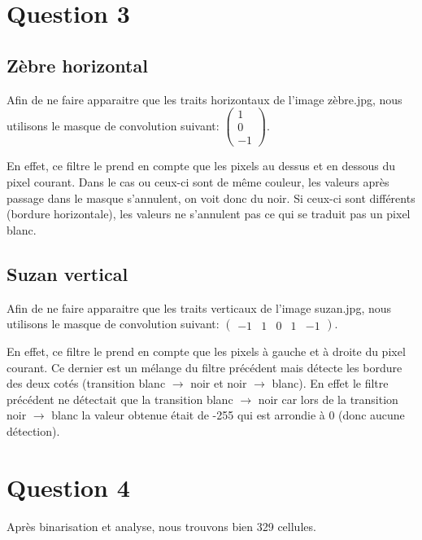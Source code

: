 \documentclass{report}
\begin{document}
		\section{Question 3}
			\subsection{Zèbre horizontal}
				Afin de ne faire apparaitre que les traits horizontaux de l'image zèbre.jpg, nous utilisons le masque de convolution suivant: $\left( \begin{array}{c}1\\0\\-1\end{array}\right)$.
				
				En effet, ce filtre le prend en compte que les pixels au dessus et en dessous du pixel courant. Dans le cas ou ceux-ci sont de même couleur, les valeurs après passage dans le masque s'annulent, on voit donc du noir. Si ceux-ci sont différents (bordure horizontale), les valeurs ne s'annulent pas ce qui se traduit pas un pixel blanc.
				

			\subsection{Suzan vertical}
				Afin de ne faire apparaitre que les traits verticaux de l'image suzan.jpg, nous utilisons le masque de convolution suivant: $\left( \begin{array}{ccccc}-1&1&0&1&-1\end{array}\right)$.
				
				En effet, ce filtre le prend en compte que les pixels à gauche et à droite du pixel courant. Ce dernier est un mélange du filtre précédent mais détecte les bordure des deux cotés (transition blanc $\rightarrow$ noir et noir $\rightarrow$ blanc). En effet le filtre précédent ne détectait que la transition blanc $\rightarrow$ noir car lors de la transition noir $\rightarrow$ blanc la valeur obtenue était de -255 qui est arrondie à 0 (donc aucune détection).
				
				
		\section{Question 4}
			Après binarisation et analyse, nous trouvons bien 329 cellules.
\end{document}
